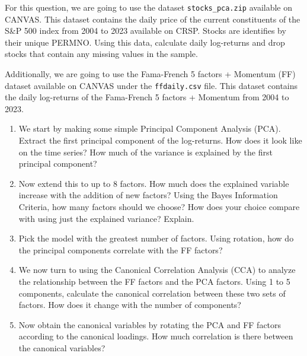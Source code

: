 For this question, we are going to use the dataset \texttt{stocks\_pca.zip} available on CANVAS. This dataset contains the daily price of the current constituents of the S\&P 500 index from 2004 to 2023 available on CRSP. Stocks are identifies by their unique PERMNO. Using this data, calculate daily log-returns and drop stocks that contain any missing values in the sample.

Additionally, we are going to use the Fama-French 5 factors + Momentum (FF) dataset available on CANVAS under the \texttt{ffdaily.csv} file. This dataset contains the daily log-returns of the Fama-French 5 factors + Momentum from 2004 to 2023.

\begin{enumerate}[label = \textbf{\Alph*)}]
    \item We start by making some simple Principal Component Analysis (PCA). Extract the first principal component of the log-returns. How does it look like on the time series? How much of the variance is explained by the first principal component?
    \item Now extend this to up to 8 factors. How much does the explained variable increase with the addition of new factors? Using the Bayes Information Criteria, how many factors should we choose? How does your choice compare with using just the explained variance? Explain.
    \item Pick the model with the greatest number of factors. Using rotation, how do the principal components correlate with the FF factors? 
    \item We now turn to using the Canonical Correlation Analysis (CCA) to analyze the relationship between the FF factors and the PCA factors. Using 1 to 5 components, calculate the canonical correlation between these two sets of factors. How does it change with the number of components?
    \item Now obtain the canonical variables by rotating the PCA and FF factors according to the canonical loadings. How much correlation is there between the canonical variables?
\end{enumerate}